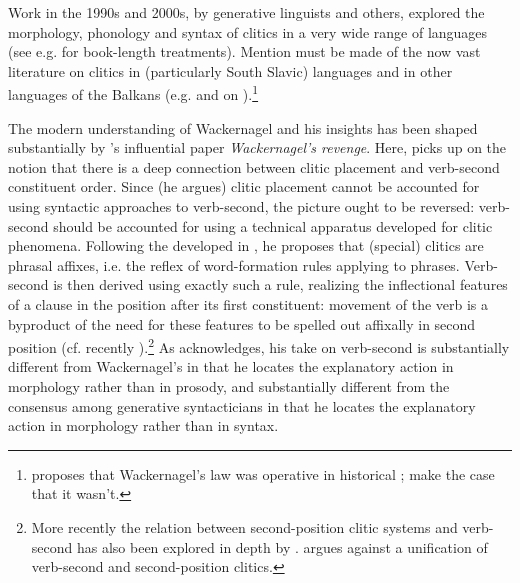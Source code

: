 \documentclass[output=paper]{../langscibook}
\begin{document}
Work in the 1990s and 2000s, by generative linguists and others, explored the morphology, phonology and syntax of clitics in a very wide range of languages (see e.g. \citealp{HalpernZwicky1996,BeukemaDenDikken2000,FranksKing2000,GerlachGrijzenhout2000,Boskovic2001,Anderson2005,Roberts2010,SpencerLuis2012,SalvesenHelland2013} for book-length treatments). Mention must be made of the now vast literature on clitics in  (particularly South Slavic) languages \citep{RadanovicKocic1988,RadanovicKocic1996,NevisJoseph1993,Schuetze1994,DimitrovaVulchanova1995,DimitrovaVulchanova1998,Progovac1996,Progovac2000,Tomic1996,Tomic2000,Franks1997,Franks2000,Franks2008,FranksBoskovic2001,FranksKing2000,Boskovic2000,Boskovic2001,Boskovic2002,Boskovic2016,Pancheva2005,Migdalski2010,Migdalski2012,Migdalski2016,DiesingZec2011,Harizanov2014,Despic2017} and in other languages of the Balkans (e.g. \citealp{Francu2009} and \citealp{AlboiuHill2012} on ).\footnote{\citet{Francu2009} proposes that Wackernagel's law was operative in historical ; \citet{AlboiuHill2012} make the case that it wasn't.}

The modern understanding of Wackernagel and his insights has been shaped substantially by \citeauthor{Anderson1993}'s \citeyearpar{Anderson1993} influential paper \textit{Wackernagel's revenge}. Here, \citeauthor{Anderson1993} picks up on the notion that there is a deep connection between clitic placement and verb-second constituent order. Since (he argues) clitic placement cannot be accounted for using syntactic approaches to verb-second, the picture ought to be reversed: verb-second should be accounted for using a technical apparatus developed for clitic phenomena. Following the  developed in \citet{Anderson1992}, he proposes that (special) clitics are phrasal affixes, i.e. the reflex of word-formation rules applying to phrases. Verb-second is then derived using exactly such a rule, realizing the inflectional features of a clause in the position after its first constituent: movement of the verb is a byproduct of the need for these features to be spelled out affixally in second position (cf. recently \citealp{BayerFreitag2020}).\footnote{More recently the relation between second-position clitic systems and verb-second has also been explored in depth by \citet{Migdalski2010,Migdalski2016}. \citet{Boskovic2020} argues against a unification of verb-second and second-position clitics.} As \citeauthor{Anderson1993} acknowledges, his take on verb-second is substantially different from Wackernagel's in that he locates the explanatory action in morphology rather than in prosody, and substantially different from the consensus among generative syntacticians in that he locates the explanatory action in morphology rather than in syntax.
\end{document}
